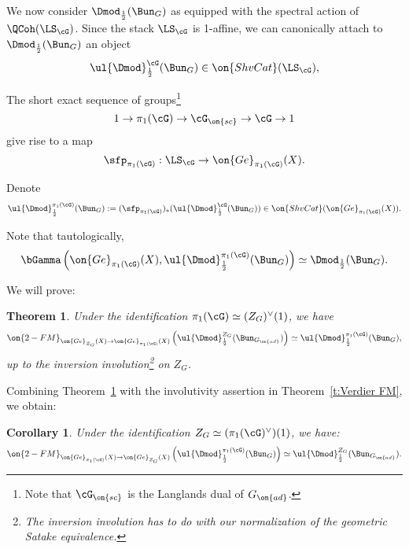 \documentclass[9pt]{amsart}
\newtheorem{cor}[subsubsection]{Corollary}
\newtheorem{thm}[subsubsection]{Theorem}
\theoremstyle{remark}
\theoremstyle{definition}
\theoremstyle{remark}
\newcommand{\thmref}[1]{Theorem~\ref{#1}}
\numberwithin{equation}{section}
\begin{document}
\sssec{}

We now consider $\Dmod_{\frac{1}{2}}(\Bun_G)$ as equipped with the spectral action of $\QCoh(\LS_\cG)$. Since the stack $\LS_\cG$ 
is 1-affine, we can canonically attach to  $\Dmod_{\frac{1}{2}}(\Bun_G)$ an object
\begin{equation} \label{e:1-aff upgrade}
\ul{\Dmod}^{\cG}_{\frac{1}{2}}(\Bun_G)\in \on{ShvCat}(\LS_\cG), 
\end{equation} 

\medskip

The short exact sequence of groups\footnote{Note that $\cG_{\on{sc}}$ is the Langlands dual of $G_{\on{ad}}$.}
$$1\to \pi_1(\cG)\to \cG_{\on{sc}}\to \cG\to 1$$
give rise to a map 
\begin{equation} \label{e:LS to gerbe}
\sfp_{\pi_1(\cG)}:\LS_\cG\to \on{Ge}_{\pi_1(\cG)}(X).
\end{equation} 

Denote
$$\ul{\Dmod}^{\pi_1(\cG)}_{\frac{1}{2}}(\Bun_G):=(\sfp_{\pi_1(\cG)})_*(\ul{\Dmod}^{\cG}_{\frac{1}{2}}(\Bun_G))\in 
\on{ShvCat}(\on{Ge}_{\pi_1(\cG)}(X)).$$

\medskip

Note that tautologically,
\begin{equation} \label{e:glob sect BunG sheaf dual}
\bGamma\left(\on{Ge}_{\pi_1(\cG)}(X),\ul{\Dmod}^{\pi_1(\cG)}_{\frac{1}{2}}(\Bun_G)\right) \simeq
\Dmod_{\frac{1}{2}}(\Bun_G).
\end{equation} 

\sssec{}

We will prove:

\begin{thm} \label{t:FM L}
Under the identification $\pi_1(\cG)\simeq (Z_G)^\vee(1)$, we have
$$\on{2-FM}_{\on{Ge}_{Z_G}(X)\to \on{Ge}_{\pi_1(\cG)}(X)}\left(\ul{\Dmod}^{Z_G}_{\frac{1}{2}}(\Bun_{G_{\on{ad}}})\right)\simeq
\ul{\Dmod}^{\pi_1(\cG)}_{\frac{1}{2}}(\Bun_G),$$
up to the inversion involution\footnote{The inversion involution has to do with our normalization of the geometric Satake equivalence.}  
on $Z_G$.
\end{thm} 

Combining \thmref{t:FM L} with the involutivity assertion in \thmref{t:Verdier FM}, we obtain: 

\begin{cor} \label{c:FM L}
Under the identification $Z_G\simeq (\pi_1(\cG)^\vee)(1)$, we have:
$$\on{2-FM}_{\on{Ge}_{\pi_1(\cG)}(X)\to \on{Ge}_{Z_G}(X)}\left(\ul{\Dmod}^{\pi_1(\cG)}_{\frac{1}{2}}(\Bun_G)\right)
\simeq \ul{\Dmod}^{Z_G}_{\frac{1}{2}}(\Bun_{G_{\on{ad}}}).$$
\end{cor}
\end{document}
